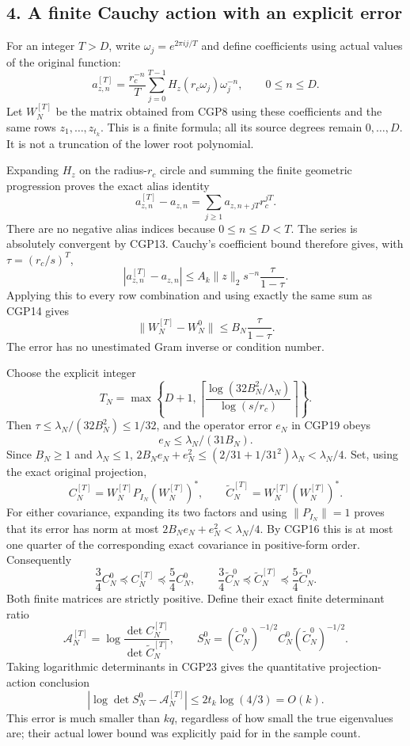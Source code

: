 \documentclass[11pt]{article}
\begin{document}
\subsection{4. A finite Cauchy action with an explicit error}\label{a-finite-cauchy-action-with-an-explicit-error}

For an integer \(T>D\), write \(\omega_j=e^{2\pi ij/T}\) and define coefficients using actual values of the original function: \[
a_{z,n}^{[T]}=\frac{r_c^{-n}}{T}
\sum_{j=0}^{T-1}H_z(r_c\omega_j)\omega_j^{-n},
\qquad 0\le n\le D.
\tag{CGP17}
\] Let \(W_N^{[T]}\) be the matrix obtained from CGP8 using these coefficients and the same rows \(z_1,\ldots,z_{t_k}\). This is a finite formula; all its source degrees remain \(0,\ldots,D\). It is not a truncation of the lower root polynomial.

Expanding \(H_z\) on the radius-\(r_c\) circle and summing the finite geometric progression proves the exact alias identity \[
a_{z,n}^{[T]}-a_{z,n}
=\sum_{j\ge1}a_{z,n+jT}r_c^{jT}.
\tag{CGP18}
\] There are no negative alias indices because \(0\le n\le D<T\). The series is absolutely convergent by CGP13. Cauchy's coefficient bound therefore gives, with \(\tau=(r_c/s)^T\), \[
|a_{z,n}^{[T]}-a_{z,n}|
\le A_k\|z\|_2s^{-n}\frac{\tau}{1-\tau}.
\] Applying this to every row combination and using exactly the same sum as CGP14 gives \[
\boxed{\|W_N^{[T]}-W_N^0\|
\le B_N\frac{\tau}{1-\tau}.}
\tag{CGP19}
\] The error has no unestimated Gram inverse or condition number.

Choose the explicit integer \[
T_N=\max\left\{D+1,
\left\lceil\frac{\log(32B_N^2/\lambda_N)}
{\log(s/r_c)}\right\rceil\right\}.
\tag{CGP20}
\] Then \(\tau\le\lambda_N/(32B_N^2)\le1/32\), and the operator error \(e_N\) in CGP19 obeys \[
e_N\le\lambda_N/(31B_N).
\tag{CGP21}
\] Since \(B_N\ge1\) and \(\lambda_N\le1\), \(2B_Ne_N+e_N^2\le(2/31+1/31^2)\lambda_N
<\lambda_N/4\). Set, using the exact original projection, \[
C_N^{[T]}=W_N^{[T]}P_{I_N}(W_N^{[T]})^*,\qquad
\widetilde C_N^{[T]}=W_N^{[T]}(W_N^{[T]})^*.
\tag{CGP22}
\] For either covariance, expanding its two factors and using \(\|P_{I_N}\|=1\) proves that its error has norm at most \(2B_Ne_N+e_N^2<\lambda_N/4\). By CGP16 this is at most one quarter of the corresponding exact covariance in positive-form order. Consequently \[
\frac34 C_N^0\preceq C_N^{[T]}\preceq\frac54 C_N^0,
\qquad
\frac34\widetilde C_N^0\preceq\widetilde C_N^{[T]}
\preceq\frac54\widetilde C_N^0.
\tag{CGP23}
\] Both finite matrices are strictly positive. Define their exact finite determinant ratio \[
\mathcal A_N^{[T]}=
\log\frac{\det C_N^{[T]}}{\det\widetilde C_N^{[T]}},
\qquad
S_N^0=(\widetilde C_N^0)^{-1/2}C_N^0
(\widetilde C_N^0)^{-1/2}.
\] Taking logarithmic determinants in CGP23 gives the quantitative projection-action conclusion \[
\boxed{|\log\det S_N^0-\mathcal A_N^{[T]}|
\le2t_k\log(4/3)=O(k).}
\tag{CGP24}
\] This error is much smaller than \(kq\), regardless of how small the true eigenvalues are; their actual lower bound was explicitly paid for in the sample count.
\end{document}
